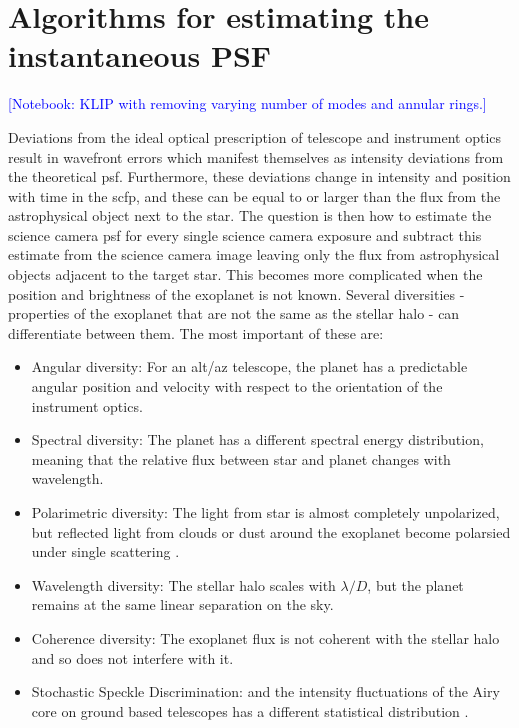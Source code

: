 \documentclass[letterpaper]{ar-1col}
\newcommand{\ld}{$\lambda/D$}
\newcommand{\notebooksuggestion}[1]{\textcolor{blue}{[Notebook: #1]}}
\begin{document}
\section{Algorithms for estimating the instantaneous PSF}

\notebooksuggestion{KLIP with removing varying number of modes and annular rings.}

Deviations from the ideal optical prescription of telescope and instrument optics result in wavefront errors which manifest themselves as intensity deviations from the theoretical \ac{psf}.
%
Furthermore, these deviations change in intensity and position with time in the \ac{scfp}, and these can be equal to or larger than the flux from the astrophysical object next to the star.
%
The question is then how to estimate the science camera \ac{psf} for every single science camera exposure  and subtract this estimate from the science camera image leaving only the flux from astrophysical objects adjacent to the target star.
%
This becomes more complicated when the position and brightness of the exoplanet is not known.
%
%
Several diversities - properties of the exoplanet that are not the same as the stellar halo - can differentiate between them.
%
The most important of these are:

\begin{itemize}
    \item Angular diversity: For an alt/az telescope, the planet has a predictable angular position and velocity with respect to the orientation of the instrument optics.
    \item Spectral diversity: The planet has a different spectral energy distribution, meaning that the relative flux between star and planet changes with wavelength.
    \item Polarimetric diversity: The light from star is almost completely unpolarized, but reflected light from clouds or dust around the exoplanet become polarsied under single scattering \citep{Gledhill91}.
    \item Wavelength diversity: The stellar halo scales with \ld{}, but the planet remains at the same linear separation on the sky.
    \item Coherence diversity: The exoplanet flux is not coherent with the stellar halo and so does not interfere with it.
    \item Stochastic Speckle Discrimination: and the intensity fluctuations of the Airy core on ground based telescopes has a different statistical distribution \citep{Gladysz09}.
\end{itemize}
\end{document}
